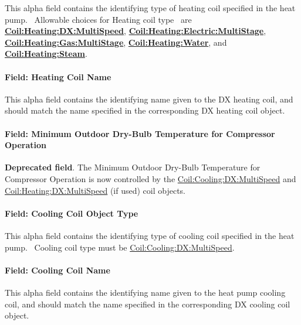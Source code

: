 This alpha field contains the identifying type of heating coil specified in the heat pump.~ Allowable choices for Heating coil type~ are \textbf{\hyperref[coilheatingdxmultispeed]{Coil:Heating:DX:MultiSpeed}}, \textbf{\hyperref[coilheatingelectricmultistage]{Coil:Heating:Electric:MultiStage}}, \textbf{\hyperref[coilheatinggasmultistage]{Coil:Heating:Gas:MultiStage}}, \textbf{\hyperref[coilheatingwater]{Coil:Heating:Water}}, and~ \textbf{\hyperref[coilheatingsteam]{Coil:Heating:Steam}}.

\paragraph{Field: Heating Coil Name}\label{field-heating-coil-name-4}

This alpha field contains the identifying name given to the DX heating coil, and should match the name specified in the corresponding DX heating coil object.

\paragraph{Field: Minimum Outdoor Dry-Bulb Temperature for Compressor Operation}\label{field-minimum-outdoor-dry-bulb-temperature-for-compressor-operation-000}

\textbf{Deprecated field}. The Minimum Outdoor Dry-Bulb Temperature for Compressor Operation is now controlled by the \hyperref[coilcoolingdxmultispeed]{Coil:Cooling:DX:MultiSpeed} and \hyperref[coilheatingdxmultispeed]{Coil:Heating:DX:MultiSpeed} (if used) coil objects.

\paragraph{Field: Cooling Coil Object Type}\label{field-cooling-coil-object-type-4}

This alpha field contains the identifying type of cooling coil specified in the heat pump.~ Cooling coil type must be \hyperref[coilcoolingdxmultispeed]{Coil:Cooling:DX:MultiSpeed}.

\paragraph{Field: Cooling Coil Name}\label{field-cooling-coil-name-4}

This alpha field contains the identifying name given to the heat pump cooling coil, and should match the name specified in the corresponding DX cooling coil object.


